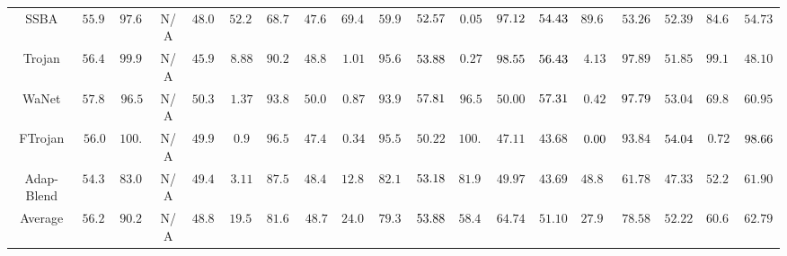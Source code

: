 \begin{table*}[t]
{\begin{tabular}{c|ccc|ccc|ccc|ccc|ccc|ccc}
SSBA \cite{li2021invisible} & $55.97$& $97.69$&  N/A & $48.06$& $52.25$& $68.76$& $47.67$& $69.47$& $59.96$& $\cellcolor[HTML]{D7E8F2}52.57$& $0.05$& $\cellcolor[HTML]{FEEBB8}97.12$& $\cellcolor[HTML]{F1B9B6}54.43$& $89.63$& $53.26$& $52.39$& $84.64$& $54.73$\\
Trojan \cite{Trojannn} & $56.48$& $99.97$&  N/A & $45.96$& $8.88$& $90.28$& $48.83$& $1.01$& $95.66$& $\cellcolor[HTML]{FEEBB8}53.88$& $0.27$& $\cellcolor[HTML]{F1B9B6}98.55$& $\cellcolor[HTML]{F1B9B6}56.43$& $4.13$& $97.89$& $51.85$& $99.15$& $48.10$\\
WaNet \cite{nguyen2021wanet} & $57.81$& $96.5$&  N/A & $50.35$& $1.37$& $93.83$& $50.02$& $0.87$& $93.92$& $\cellcolor[HTML]{F1B9B6}57.81$& $96.5$& $50.00$& $\cellcolor[HTML]{FEEBB8}57.31$& $0.42$& $\cellcolor[HTML]{F1B9B6}97.79$& $53.04$& $69.82$& $60.95$\\
FTrojan \cite{wang2022invisible} & $56.0$& $100.0$&  N/A & $49.93$& $0.9$& $96.51$& $47.43$& $0.34$& $95.54$& $50.22$& $100.0$& $47.11$& $43.68$& $\cellcolor[HTML]{FEEBB8}0.00$& $93.84$& $\cellcolor[HTML]{FEEBB8}54.04$& $0.72$& $\cellcolor[HTML]{FEEBB8}98.66$\\
Adap-Blend \cite{qi2023revisiting} & $54.32$& $83.04$&  N/A & $49.43$& $3.11$& $87.52$& $48.43$& $12.86$& $82.14$& $\cellcolor[HTML]{F1B9B6}53.18$& $81.95$& $49.97$& $43.69$& $48.84$& $61.78$& $47.33$& $52.24$& $61.90$\\ \midrule
Average & $56.21$& $90.23$&  N/A & $48.84$& $19.58$& $81.64$& $48.7$& $24.05$& $79.33$& $\cellcolor[HTML]{F1B9B6}53.88$& $58.42$& $64.74$& $51.10$& $27.96$& $78.58$& $52.22$& $60.65$& $62.79$\\

\toprule


\end{tabular}}
\end{table*}
